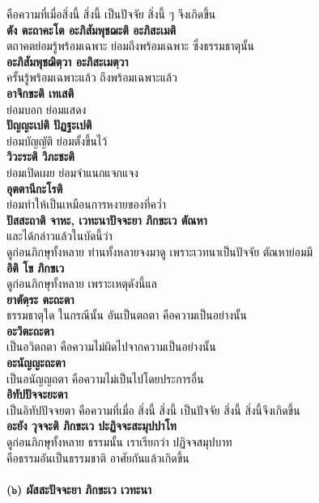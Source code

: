 \documentclass[12pt]{article}
\begin{document}
\indent คือความที่เมื่อสิ่งนี้ สิ่งนี้ เป็นปัจจัย สิ่งนี้ ๆ จึงเกิดขึ้น\\
\textbf{ตัง ตะถาคะโต อะภิสัมพุชฌะติ อะภิสะเมติ}\\
\indent ตถาคตย่อมรู้พร้อมเฉพาะ ย่อมถึงพร้อมเฉพาะ ซึ่งธรรมธาตุนั้น\\
\textbf{อะภิสัมพุชฌิตฺวา อะภิสะเมตฺวา}\\
\indent ครั้นรู้พร้อมเฉพาะแล้ว ถึงพร้อมเฉพาะแล้ว\\
\textbf{อาจิกขะติ เทเสติ}\\
\indent ย่อมบอก ย่อมแสดง\\
\textbf{ปัญญะเปติ ปัฏฐะเปติ}\\
\indent ย่อมบัญญัติ ย่อมตั้งขึ้นไว้\\
\textbf{วิวะระติ วิภะชะติ}\\
\indent ย่อมเปิดเผย ย่อมจำแนกแจกแจง\\
\textbf{อุตตานีกะโรติ}\\
\indent ย่อมทำให้เป็นเหมือนการหงายของที่คว่ำ\\
\textbf{ปัสสะถาติ จาหะ, เวทะนาปัจจะยา ภิกขะเว ตัณหา}\\
\indent และได้กล่าวแล้วในบัดนี้ว่า \\
\indent ดูก่อนภิกษุทั้งหลาย ท่านทั้งหลายจงมาดู เพราะเวทนาเป็นปัจจัย ตัณหาย่อมมี\\
\textbf{อิติ โข ภิกขเว}\\
\indent ดูก่อนภิกษุทั้งหลาย เพราะเหตุดังนี้แล\\
\textbf{ยาตัตฺระ ตะถะตา}\\
\indent ธรรมธาตุใด ในกรณีนั้น อันเป็นตถตา คือความเป็นอย่างนั้น\\
\textbf{อะวิตะถะตา}\\
\indent เป็นอวิตถตา คือความไม่ผิดไปจากความเป็นอย่างนั้น\\
\textbf{อะนัญญะถะตา}\\
\indent เป็นอนัญญถตา คือความไม่เป็นไปโดยประการอื่น\\
\textbf{อิทัปปัจจะยะตา}\\
\indent เป็นอิทัปปัจจยตา คือความที่เมื่อ สิ่งนี้ สิ่งนี้ เป็นปัจจัย สิ่งนี้ สิ่งนี้จึงเกิดขึ้น\\
\textbf{อะยัง วุจจะติ ภิกขะเว ปะฏิจจะสะมุปปาโท}\\
\indent ดูก่อนภิกษุทั้งหลาย ธรรมนั้น เราเรียกว่า ปฏิจจสมุปบาท \\
\indent คือธรรมอันเป็นธรรมชาติ อาศัยกันแล้วเกิดขึ้น\\
\\
\textbf{(๖) ผัสสะปัจจะยา ภิกขะเว เวทะนา}\\
\end{document}

